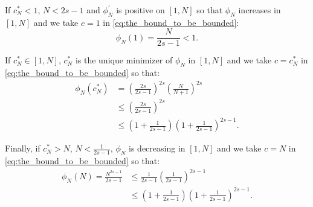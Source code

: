 \documentclass[twoside,11pt]{book}
\numberwithin{theorem}{chapter}
\numberwithin{definition}{chapter}
\numberwithin{proposition}{chapter}
\numberwithin{corollary}{chapter}
\numberwithin{example}{chapter}
\numberwithin{lemma}{chapter}
\newcommand{\pc}[1]{\textcolor{blue}{#1}}
\newcommand{\rb}[1]{\textcolor{magenta}{#1}}
\begin{document}
If $c_{N}^{*}< 1$, $N < 2s-1$ and $\phi_{N}^{'}$ is positive on $[1,N]$ so that $\phi_{N}$ increases in $[1,N]$ and we take $c = 1$ in \eqref{eq:the_bound_to_be_bounded}:
\begin{equation}
\phi_{N}(1) = \frac{N}{2s-1} < 1.
\end{equation}

If $c_{N}^{*} \in [1,N]$, $c_{N}^{*}$ is the unique minimizer of $\phi_{N}$ in $[1,N]$ and we take $c = c_{N}^{*}$ in \eqref{eq:the_bound_to_be_bounded} so that: 
\begin{align}
\phi_{N}(c_{N}^{*}) &= \left(\frac{2s}{2s-1}\right)^{2s} \left(\frac{N}{N+1}\right)^{2s}\\
& \leq \left(\frac{2s}{2s-1}\right)^{2s}\\
& \leq \left(1+\frac{1}{2s-1}\right)\left(1+\frac{1}{2s-1}\right)^{2s-1}.
\label{e:useful_for_limits_as_well}
\end{align}

Finally, if $c_{N}^{*} > N$, $N < \frac{1}{2s-1}$, $\phi_{N}$ is decreasing in $[1,N]$ and we take $c = N$ in \eqref{eq:the_bound_to_be_bounded} so that:
\begin{align}
\phi_{N}(N) = \frac{N^{2s-1}}{2s-1} &\leq \frac{1}{2s-1} \left(\frac{1}{2s-1}\right)^{2s-1} \\
&\leq \left(1+\frac{1}{2s-1}\right) \left(1+\frac{1}{2s-1}\right)^{2s-1}. \label{e:useful_for_limits}
\end{align}





\end{document}
